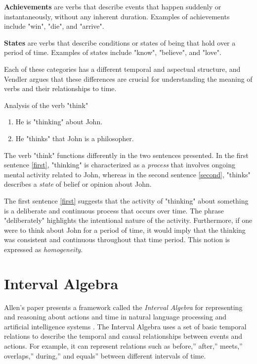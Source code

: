 \textbf{Achievements} are verbs that describe events that happen suddenly or instantaneously, without any inherent duration. Examples of achievements include "win", "die", and "arrive".


\textbf{States} are verbs that describe conditions or states of being that hold over a period of time. Examples of states include "know", "believe", and "love".

Each of these categories has a different temporal and aspectual structure, and Vendler argues that these differences are crucial for understanding the meaning of verbs and their relationships to time.



\begin{exmp} Analysis of the verb "think"
\begin{enumerate}
  \item He is "thinking" about John. \label{first}
  \item He "thinks" that John is a philosopher. \label{second}
\end{enumerate}

The verb "think" functions differently in the two sentences presented. In the first sentence \ref{first}, "thinking" is characterized as a \textit{process} that involves ongoing mental activity related to John, whereas in the second sentence \ref{second}, "thinks" describes a \textit{state} of belief or opinion about John.

 The first sentence \ref{first} suggests that the activity of "thinking" about something is a deliberate and continuous process that occurs over time. The phrase "deliberately" highlights the intentional nature of the activity. Furthermore, if one were to think about John for a period of time, it would imply that the thinking was consistent and continuous throughout that time period. This notion is expressed as \textit{homogeneity}.
\end{exmp}


\section{Interval Algebra}

Allen's paper presents a framework called the \textit{Interval Algebra} for representing and reasoning about actions and time in natural language processing and artificial intelligence systems \cite{allen1984towards}. The Interval Algebra uses a set of basic temporal relations to describe the temporal and causal relationships between events and actions. For example, it can represent relations such as before,'' after,'' meets,'' overlaps,'' during,'' and equals'' between different intervals of time.

